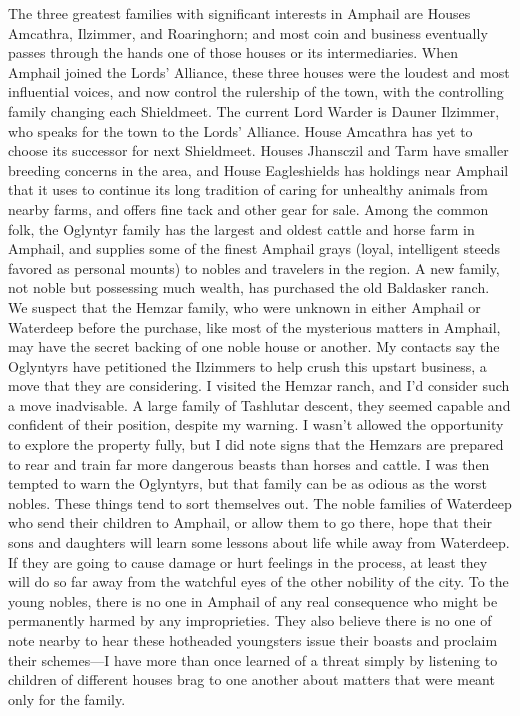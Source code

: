 \documentclass[10pt,a4paper,twoside,twocolumn,openany,bg=print,nodeprecatedcode]{dndbook}
\begin{document}
The three greatest families with significant interests in Amphail are Houses Amcathra, Ilzimmer, and Roaringhorn; and most coin and business eventually passes through the hands one of those houses or its intermediaries. When Amphail joined the Lords' Alliance, these three houses were the loudest and most influential voices, and now control the rulership of the town, with the controlling family changing each Shieldmeet. The current Lord Warder is Dauner Ilzimmer, who speaks for the town to the Lords' Alliance. House Amcathra has yet to choose its successor for next Shieldmeet. Houses Jhansczil and Tarm have smaller breeding concerns in the area, and House Eagleshields has holdings near Amphail that it uses to continue its long tradition of caring for unhealthy animals from nearby farms, and offers fine tack and other gear for sale.
Among the common folk, the Oglyntyr family has the largest and oldest cattle and horse farm in Amphail, and supplies some of the finest Amphail grays (loyal, intelligent steeds favored as personal mounts) to nobles and travelers in the region. A new family, not noble but possessing much wealth, has purchased the old Baldasker ranch. We suspect that the Hemzar family, who were unknown in either Amphail or Waterdeep before the purchase, like most of the mysterious matters in Amphail, may have the secret backing of one noble house or another.
My contacts say the Oglyntyrs have petitioned the Ilzimmers to help crush this upstart business, a move that they are considering. I visited the Hemzar ranch, and I'd consider such a move inadvisable. A large family of Tashlutar descent, they seemed capable and confident of their position, despite my warning. I wasn't allowed the opportunity to explore the property fully, but I did note signs that the Hemzars are prepared to rear and train far more dangerous beasts than horses and cattle. I was then tempted to warn the Oglyntyrs, but that family can be as odious as the worst nobles. These things tend to sort themselves out.
The noble families of Waterdeep who send their children to Amphail, or allow them to go there, hope that their sons and daughters will learn some lessons about life while away from Waterdeep. If they are going to cause damage or hurt feelings in the process, at least they will do so far away from the watchful eyes of the other nobility of the city. To the young nobles, there is no one in Amphail of any real consequence who might be permanently harmed by any improprieties. They also believe there is no one of note nearby to hear these hotheaded youngsters issue their boasts and proclaim their schemes—I have more than once learned of a threat simply by listening to children of different houses brag to one another about matters that were meant only for the family.
\end{document}
